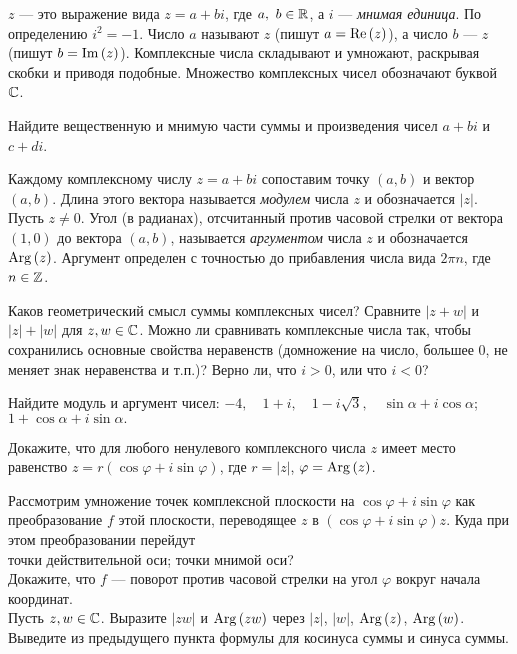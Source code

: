 \documentclass[a4paper,11pt]{article}
\begin{document}


 $z$ --- это выражение вида
$z=a+bi$, где $a,\ b\in\mathbb{R}$, а $i$ --- {\em мнимая
единица\/}. По определению  $i^2=-1$.
Число $a$ называют  %
$z$ (пишут $a={\rm Re}\,(z)$), а число $b$ ---
 $z$ (пишут $b={\rm Im}\,(z)$).
Комплексные числа складывают и умножают,
 раскрывая скобки и приводя подобные.
Множество комплексных чисел обозначают буквой $\mathbb{C}$.




Найдите вещественную и мнимую части суммы и произведения чисел $a+bi$ и $c+di$.



Каждому комплексному числу $z=a+bi$ сопоставим точку $(a,b)$
и вектор %
$(a,b)$. Длина этого вектора называется {\em модулем\/} %
числа $z$ и обозначается $|z|$. Пусть $z\ne0$.
Угол (в радианах), отсчитанный против часовой стрелки
от вектора %
$(1,0)$ до вектора %
$(a,b)$,
называется {\em аргументом\/} %
числа $z$ и обозначается
${\rm Arg}\,(z)$. %
Аргумент %
определен с точностью до прибавления числа вида $2\pi n$, где $n\in\mathbb{Z}$.

 Каков геометрический смысл суммы комплексных чисел?
 Сравните $|z+w|$ и $|z|+|w|$ для $z,w\in\mathbb{C}$.
 Можно ли сравнивать комплексные числа так, чтобы сохранились основные свойства неравенств (домножение на число, большее 0, не меняет знак неравенства и т.п.)? Верно ли, что $i>0$, или что $i<0$?

Найдите модуль и аргумент чисел:  %
 $-4,\quad 1+i,\quad 1-i\sqrt{3},\quad \sin\alpha+i\cos\alpha$;
 $1+\cos\alpha+i\sin\alpha.$


Докажите, что для любого ненулевого комплексного числа $z$ имеет место
равенство $z=r (\cos \varphi +i\sin \varphi )$, где $r=|z|$,
$\varphi={\rm Arg}\,(z)$.



Рассмотрим умножение точек комплексной плоскости на %
$\cos\varphi+i\sin\varphi$ как преобразование $f$ этой плоскости, переводящее $z$ в $(\cos\varphi+i\sin\varphi)z$.
Куда при этом преобразовании перейдут\\  точки действительной оси; \quad {} точки мнимой оси?\\
 Докажите, что %
$f$ --- поворот против часовой стрелки на угол $\varphi$ вокруг начала координат.\\
Пусть $z,w\in\mathbb{C}$. %
Выразите $|zw|$ и
${\rm Arg}\,(zw)$
через $|z|$, $|w|$, ${\rm Arg}\,(z)$, ${\rm Arg}\,(w)$.\\
 Выведите из предыдущего пункта
формулы для косинуса суммы и синуса суммы.
\end{document}
